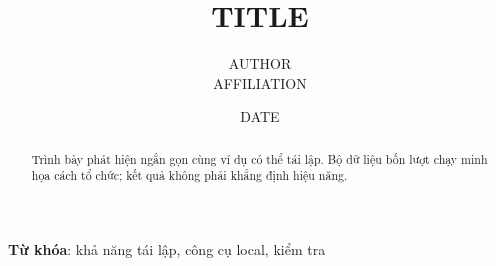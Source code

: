 \documentclass{article}
\title{{{TITLE}}}
\author{{{AUTHOR}} \\ {{AFFILIATION}}}
\date{{{DATE}}}
\begin{document}
\maketitle
\begin{abstract}Trình bày phát hiện ngắn gọn cùng ví dụ có thể tái lập. Bộ dữ liệu bốn lượt chạy minh họa cách tổ chức; kết quả không phải khẳng định hiệu năng.\end{abstract}
\textbf{Từ khóa}: khả năng tái lập, công cụ local, kiểm tra





\end{document}
